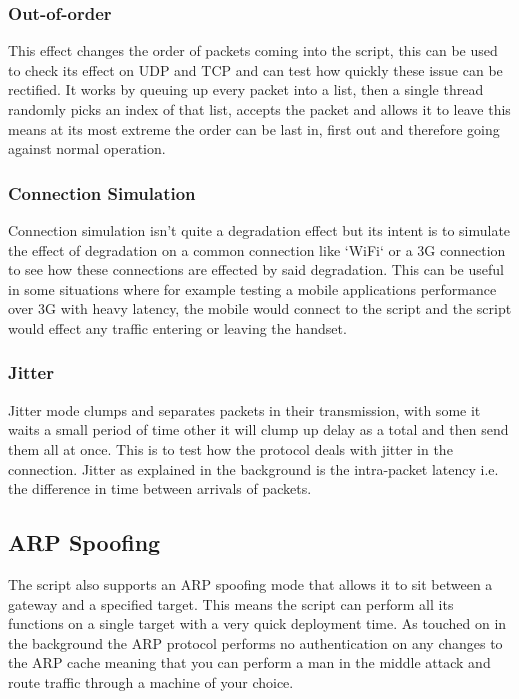 \subsubsection*{Out-of-order}
This effect changes the order of packets coming into the script, this can be used to check its effect on UDP and TCP and can test how quickly these issue can be rectified. It works by queuing up every packet into a list, then a single thread randomly picks an index of that list, accepts the packet and allows it to leave this means at its most extreme the order can be last in, first out and therefore going against normal operation.

\subsubsection*{Connection Simulation}
Connection simulation isn't quite a degradation effect but its intent is to simulate the effect of degradation on a common connection like `WiFi` or a 3G connection to see how these connections are effected by said degradation. This can be useful in some situations where for example testing a mobile applications performance over 3G with heavy latency, the mobile would connect to the script and the script would effect any traffic entering or leaving the handset.

\subsubsection*{Jitter}
Jitter mode clumps and separates packets in their transmission, with some it waits a small period of time other it will clump up delay as a total and then send them all at once. This is to test how the protocol deals with jitter in the connection. Jitter as explained in the background is the intra-packet latency i.e. the difference in time between arrivals of packets.

\subsection{ARP Spoofing}
The script also supports an ARP spoofing mode that allows it to sit between a gateway and a specified target. This means the script can perform all its functions on a single target with a very quick deployment time. As touched on in the background the ARP protocol performs no authentication on any changes to the ARP cache meaning that you can perform a man in the middle attack and route traffic through a machine of your choice.

